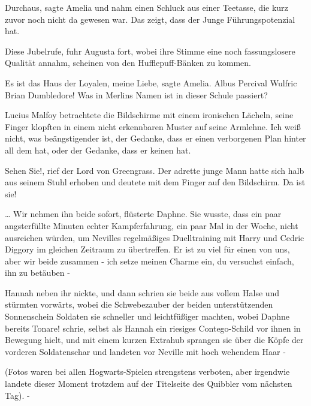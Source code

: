 \glqq{}Durchaus\grqq{}, sagte Amelia und nahm einen Schluck aus einer Teetasse,
die kurz zuvor noch nicht da gewesen war. \glqq{}Das zeigt, dass der Junge
Führungspotenzial hat.\grqq{}

\glqq{}Diese Jubelrufe\grqq{}, fuhr Augusta fort, wobei ihre Stimme eine noch
fassungslosere Qualität annahm, \glqq{}scheinen von den Hufflepuff-Bänken zu
kommen.\grqq{}

\glqq{}Es ist das Haus der Loyalen, meine Liebe\grqq{}, sagte Amelia. \glqq{}Albus
Percival Wulfric Brian Dumbledore! Was in Merlins Namen ist in dieser Schule
passiert?\grqq{}

Lucius Malfoy betrachtete die Bildschirme mit einem ironischen Lächeln, seine
Finger klopften in einem nicht erkennbaren Muster auf seine Armlehne. \glqq{}Ich
weiß nicht, was beängstigender ist, der Gedanke, dass er einen verborgenen Plan
hinter all dem hat, oder der Gedanke, dass er keinen hat.\grqq{}

\glqq{}Sehen Sie!\grqq{}, rief der Lord von Greengrass. Der adrette junge Mann
hatte sich halb aus seinem Stuhl erhoben und deutete mit dem Finger auf den
Bildschirm. \glqq{}Da ist sie!\grqq{}

… \glqq{}Wir nehmen ihn beide sofort\grqq{}, flüsterte Daphne. Sie wusste, dass
ein paar angsterfüllte Minuten echter Kampferfahrung, ein paar Mal in der Woche,
nicht ausreichen würden, um Nevilles regelmäßiges Duelltraining mit Harry und
Cedric Diggory im gleichen Zeitraum zu übertreffen. \glqq{}Er ist zu viel für
einen von uns, aber wir beide zusammen - ich setze meinen Charme ein, du
versuchst einfach, ihn zu betäuben -\grqq{}

Hannah neben ihr nickte, und dann schrien sie beide aus vollem Halse und
stürmten vorwärts, wobei die Schwebezauber der beiden unterstützenden
Sonnenschein Soldaten sie schneller und leichtfüßiger machten, wobei Daphne
bereits \glqq{}Tonare!\grqq{} schrie, selbst als Hannah ein riesiges
Contego-Schild vor ihnen in Bewegung hielt, und mit einem kurzen Extrahub
sprangen sie über die Köpfe der vorderen Soldatenschar und landeten vor Neville
mit hoch wehendem Haar -

(Fotos waren bei allen Hogwarts-Spielen strengstens verboten, aber irgendwie
landete dieser Moment trotzdem auf der Titelseite des Quibbler vom nächsten
Tag). -

